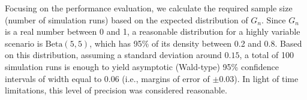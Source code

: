 Focusing on the performance evaluation, we calculate the required sample size (number of simulation runs) based on the expected distribution of $G_n$. Since $G_n$ is a real number between 0 and 1, a reasonable distribution for a highly variable scenario is $\text{Beta}(5, 5)$, which has 95\% of its density between 0.2 and 0.8. Based on this distribution, assuming a standard deviation around $0.15$, a total of 100 simulation runs is enough to yield asymptotic (Wald-type) 95\% confidence intervals of width equal to 0.06 (i.e., margins of error of $\pm 0.03$). In light of time limitations, this level of precision was considered reasonable. 